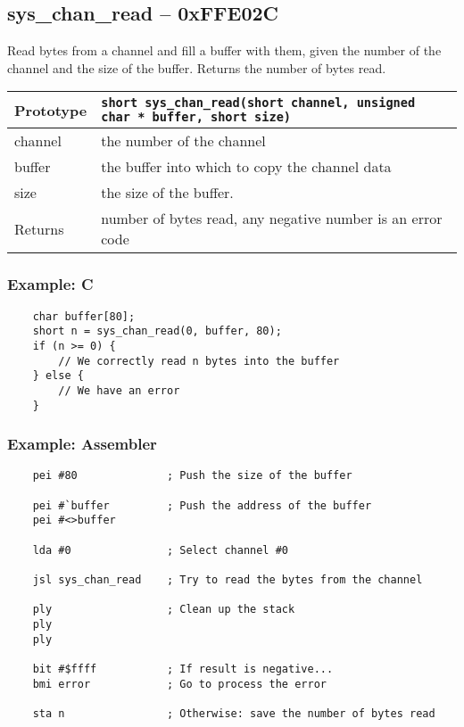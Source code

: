 \subsection*{sys\_chan\_read -- 0xFFE02C}
Read bytes from a channel and fill a buffer with them, given the number of the channel and the size of the buffer. Returns the number of bytes read.

\bigskip

\begin{tabular}{|l||l|} \hline
Prototype & \lstinline!short sys_chan_read(short channel, unsigned char * buffer, short size)! \\ \hline
channel & the number of the channel \\ \hline
buffer & the buffer into which to copy the channel data \\ \hline
size & the size of the buffer. \\ \hline
Returns & number of bytes read, any negative number is an error code \\ \hline
\end{tabular}

\subsubsection*{Example: C}
\begin{lstlisting}
    char buffer[80];
    short n = sys_chan_read(0, buffer, 80);
    if (n >= 0) {
        // We correctly read n bytes into the buffer
	} else {
        // We have an error
    }
\end{lstlisting}

\subsubsection*{Example: Assembler}
\begin{verbatim}
    pei #80              ; Push the size of the buffer

    pei #`buffer         ; Push the address of the buffer
    pei #<>buffer
	
    lda #0               ; Select channel #0
	
    jsl sys_chan_read    ; Try to read the bytes from the channel
	
    ply                  ; Clean up the stack
    ply
    ply
	
    bit #$ffff           ; If result is negative...
    bmi error            ; Go to process the error
	
    sta n                ; Otherwise: save the number of bytes read
\end{verbatim}

